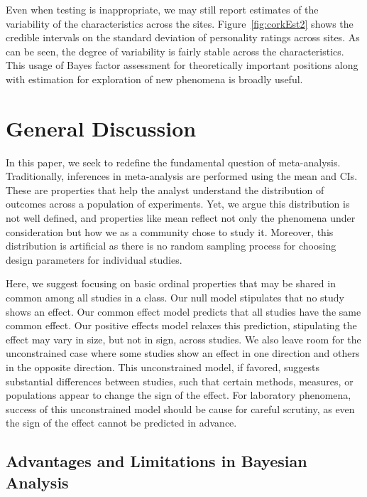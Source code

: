 \documentclass[english,man]{apa6}
\theoremstyle{definition}
\theoremstyle{definition}
\theoremstyle{remark}
\begin{document}
Even when testing is inappropriate, we may still report estimates of the
variability of the characteristics across the sites.
Figure~\ref{fig:corkEst2} shows the credible intervals on the standard
deviation of personality ratings across sites. As can be seen, the
degree of variability is fairly stable across the characteristics. This
usage of Bayes factor assessment for theoretically important positions
along with estimation for exploration of new phenomena is broadly
useful.

\section{General Discussion}\label{general-discussion}

In this paper, we seek to redefine the fundamental question of
meta-analysis. Traditionally, inferences in meta-analysis are performed
using the mean and CIs. These are properties that help the analyst
understand the distribution of outcomes across a population of
experiments. Yet, we argue this distribution is not well defined, and
properties like mean reflect not only the phenomena under consideration
but how we as a community chose to study it. Moreover, this distribution
is artificial as there is no random sampling process for choosing design
parameters for individual studies.

Here, we suggest focusing on basic ordinal properties that may be shared
in common among all studies in a class. Our null model stipulates that
no study shows an effect. Our common effect model predicts that all
studies have the same common effect. Our positive effects model relaxes
this prediction, stipulating the effect may vary in size, but not in
sign, across studies. We also leave room for the unconstrained case
where some studies show an effect in one direction and others in the
opposite direction. This unconstrained model, if favored, suggests
substantial differences between studies, such that certain methods,
measures, or populations appear to change the sign of the effect. For
laboratory phenomena, success of this unconstrained model should be
cause for careful scrutiny, as even the sign of the effect cannot be
predicted in advance.

\subsection{Advantages and Limitations in Bayesian
Analysis}\label{advantages-and-limitations-in-bayesian-analysis}
\end{document}
